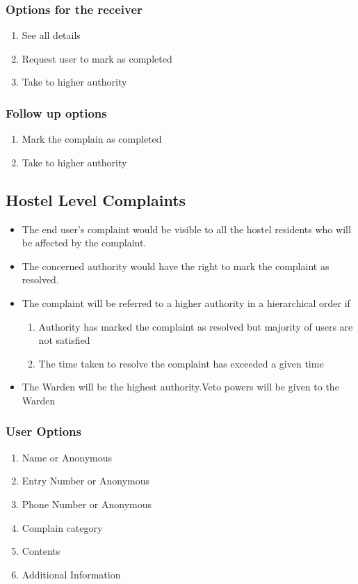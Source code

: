 \documentclass{article}
\begin{document}
			\subsubsection{Options for the receiver}
				\begin{enumerate}
					\item See all details
					\item Request user to mark as completed
					\item Take to higher authority
				\end{enumerate}
			\subsubsection{Follow up options}
				\begin{enumerate}
					\item Mark the complain as completed
					\item Take to higher authority
				\end{enumerate}
		\subsection{Hostel Level Complaints}
		\begin{itemize}
		\item The end user's complaint would be visible to all the hostel residents who will be affected by the complaint.
		\item The concerned authority would have the right to mark the complaint as resolved.
		\item The complaint will be referred to a higher authority in a hierarchical order if 
			\begin{enumerate}
			\item Authority has marked the complaint as resolved but majority of users are not satisfied
			\item The time taken to resolve the complaint has exceeded a given time
			\end{enumerate}
		\item The Warden will be the highest authority.Veto powers will be given to the Warden
		\end{itemize}
			\subsubsection{User Options}
				\begin{enumerate}
					\item Name or Anonymous
					\item Entry Number or Anonymous 
					\item Phone Number or Anonymous
					\item Complain category
					\item Contents
					\item Additional Information
				\end{enumerate}
\end{document}
